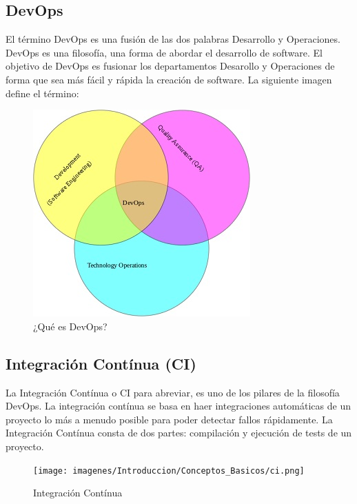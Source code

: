 	\subsection{DevOps}
		\begin{paragraph}
			El término DevOps es una fusión de las dos palabras Desarrollo y Operaciones. DevOps es una filosofía, una forma de abordar el desarrollo de software. El objetivo de DevOps es fusionar los departamentos Desarollo y Operaciones de forma que sea más fácil y rápida la creación de software. La siguiente imagen define el término:
			
			\begin{figure}[!hbt]
				\centering
				\includegraphics[scale=0.75]{imagenes/Introduccion/Conceptos_Basicos/devops.jpg}
				\caption[¿Qué es DevOps?]{¿Qué es DevOps? \cite{WhatIsDe1:online}}
				\label{termino_devops}
			\end{figure}
			 
		\end{paragraph}
	\subsection{Integración Contínua (CI)}
		\begin{paragraph}
			La Integración Contínua o CI para abreviar, es uno de los pilares de la filosofía DevOps. La integración contínua se basa en haer integraciones automáticas de un proyecto lo más a menudo posible para poder detectar fallos rápidamente. La Integración Contínua consta de dos partes: compilación y ejecución de tests de un proyecto.
			
			\begin{figure}[!hbt]
				\centering
				\texttt{[image: imagenes/Introduccion/Conceptos\_Basicos/ci.png]}
				\caption[Integración Contínua]{Integración Contínua \cite{Alcanzan90:online} }
				\label{integracion_continua} 
			\end{figure}
		\end{paragraph}

